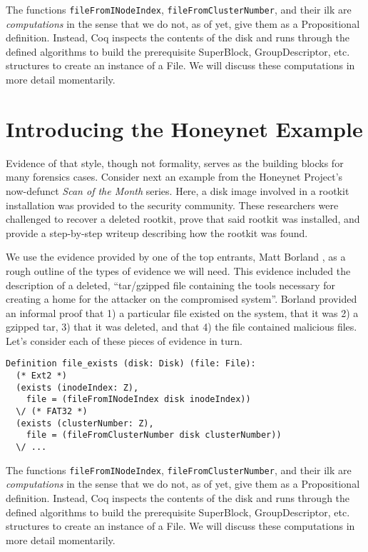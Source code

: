 \documentclass[nocopyrightspace]{sigplanconf}
\begin{document}
The functions {\tt fileFromINodeIndex}, {\tt fileFromClusterNumber}, and their
ilk are {\it computations} in the sense that we do not, as of yet, give them
as a Propositional definition. Instead, Coq inspects the contents of the disk
and runs through the defined algorithms to build the prerequisite SuperBlock,
GroupDescriptor, etc. structures to create an instance of a File. We will
discuss these computations in more detail momentarily.


\section{Introducing the Honeynet Example}

Evidence of that style, though not formality, serves as the building blocks
for many forensics cases. Consider next an example \cite{honeynet-15} from the
Honeynet Project's now-defunct {\it Scan of the Month} series. Here, a disk
image involved in a rootkit installation was provided to the security
community. These researchers were challenged to recover a deleted rootkit,
prove that said rootkit was installed, and provide a step-by-step writeup
describing how the rootkit was found.

We use the evidence provided by one of the top entrants, Matt Borland
\cite{borland-honeynet}, as a rough outline of the types of evidence we will
need. This evidence included the description of a deleted, ``tar/gzipped file
containing the tools necessary for creating a home for the attacker on the
compromised system''. Borland provided an informal proof that 1) a particular
file existed on the system, that it was 2) a gzipped tar, 3) that it was
deleted, and that 4) the file contained malicious files. Let's consider each
of these pieces of evidence in turn.


\begin{lstlisting}
Definition file_exists (disk: Disk) (file: File):
  (* Ext2 *)
  (exists (inodeIndex: Z), 
    file = (fileFromINodeIndex disk inodeIndex))
  \/ (* FAT32 *)
  (exists (clusterNumber: Z), 
    file = (fileFromClusterNumber disk clusterNumber))
  \/ ...
\end{lstlisting}

The functions {\tt fileFromINodeIndex}, {\tt fileFromClusterNumber}, and their
ilk are {\it computations} in the sense that we do not, as of yet, give them
as a Propositional definition. Instead, Coq inspects the contents of the disk
and runs through the defined algorithms to build the prerequisite SuperBlock,
GroupDescriptor, etc. structures to create an instance of a File. We will
discuss these computations in more detail momentarily.
\end{document}
